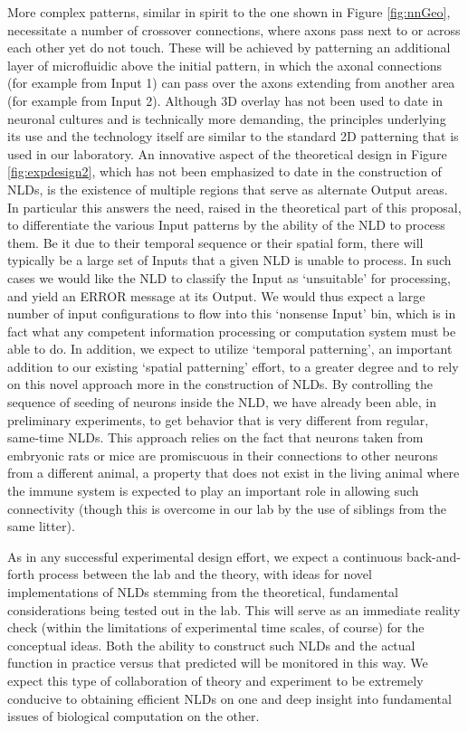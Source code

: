More complex patterns, similar in spirit to the one shown in Figure \ref{fig:nnGeo}, necessitate a number of crossover connections, where axons pass next to or across each other yet do not touch. These will be achieved by patterning an additional layer of microfluidic above the initial pattern, in which the axonal connections (for example from Input 1) can pass over the axons extending from another area (for example from Input 2). Although 3D overlay has not been used to date in neuronal cultures and is technically more demanding, the principles underlying its use and the technology \cite{Rotem2012} itself are similar to the standard 2D patterning that is used in our laboratory.
An innovative aspect of the theoretical design in Figure \ref{fig:expdesign2}, which has not been emphasized to date in the construction of NLDs, is the existence of multiple regions that serve as alternate Output areas. In particular this answers the need, raised in the theoretical part of this proposal, to differentiate the various Input patterns by the ability of the NLD to process them. Be it due to their temporal sequence or their spatial form, there will typically be a large set of Inputs that a given NLD is unable to process. In such cases we would like the NLD to classify the Input as ‘unsuitable’ for processing, and yield an ERROR message at its Output. We would thus expect a large number of input configurations to flow into this ‘nonsense Input’ bin, which is in fact what any competent information processing or computation system must be able to do.
In addition, we expect to utilize ‘temporal patterning’, an important addition to our existing ‘spatial patterning’ effort, to a greater degree and to rely on this novel approach more in the construction of NLDs. By controlling the sequence of seeding of neurons inside the NLD, we have already been able, in preliminary experiments, to get behavior that is very different from regular, same-time NLDs. This approach relies on the fact that neurons taken from embryonic rats or mice are promiscuous in their connections to other neurons from a different animal, a property that does not exist in the living animal where the immune system is expected to play an important role in allowing such connectivity (though this is overcome in our lab by the use of siblings from the same litter).

As in any successful experimental design effort, we expect a continuous back-and-forth process between the lab and the theory, with ideas for novel implementations of NLDs stemming from the theoretical, fundamental considerations being tested out in the lab. This will serve as an immediate reality check (within the limitations of experimental time scales, of course) for the conceptual ideas. Both the ability to construct such NLDs and the actual function in practice versus that predicted will be monitored in this way. We expect this type of collaboration of theory and experiment to be extremely conducive to obtaining efficient NLDs on one and deep insight into fundamental issues of biological computation on the other. 

